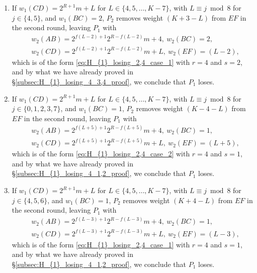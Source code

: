 \documentclass[11pt,reqno]{amsart}
\theoremstyle{definition}
\theoremstyle{definition}
\begin{document}
\begin{enumerate}
\begin{enumerate}
\item If $w_{1}(CD)=2^{R+1}m+L$ for $L \in \{4,5,\ldots,K-7\}$, with $L \equiv j \bmod 8$ for $j \in \{4,5\}$, and $w_{1}(BC)=2$, $P_{2}$ removes weight $(K+3-L)$ from $EF$ in the second round, leaving $P_{1}$ with
\begin{align}
{}&w_{2}(AB)=2^{f(L-2)+1}2^{R-f(L-2)}m+4,\ w_{2}(BC)=2,\nonumber\\
{}&w_{2}(CD)=2^{f(L-2)+1}2^{R-f(L-2)}m+L,\ w_{2}(EF)=(L-2),\nonumber
\end{align}
which is of the form \eqref{eq:H_{1}_losing_2,4_case_1} with $r=4$ and $s=2$, and by what we have already proved in \S\ref{subsec:H_{1}_losing_4_3,4_proof}, we conclude that $P_{1}$ loses. 

\item If $w_{1}(CD)=2^{R+1}m+L$ for $L \in \{4,5,\ldots,K-7\}$, with $L \equiv j \bmod 8$ for $j \in \{0,1,2,3,7\}$, and $w_{1}(BC)=1$, $P_{2}$ removes weight $(K-4-L)$ from $EF$ in the second round, leaving $P_{1}$ with
\begin{align}
{}&w_{2}(AB)=2^{f(L+5)+1}2^{R-f(L+5)}m+4,\ w_{2}(BC)=1,\nonumber\\
{}&w_{2}(CD)=2^{f(L+5)+1}2^{R-f(L+5)}m+L,\ w_{2}(EF)=(L+5),\nonumber
\end{align}
which is of the form \eqref{eq:H_{1}_losing_2,4_case_2} with $r=4$ and $s=1$, and by what we have already proved in \S\ref{subsec:H_{1}_losing_4_1,2_proof}, we conclude that $P_{1}$ loses.

\item If $w_{1}(CD)=2^{R+1}m+L$ for $L \in \{4,5,\ldots,K-7\}$, with $L \equiv j \bmod 8$ for $j \in \{4,5,6\}$, and $w_{1}(BC)=1$, $P_{2}$ removes weight $(K+4-L)$ from $EF$ in the second round, leaving $P_{1}$ with
\begin{align}
{}&w_{2}(AB)=2^{f(L-3)+1}2^{R-f(L-3)}m+4,\ w_{2}(BC)=1,\nonumber\\
{}&w_{2}(CD)=2^{f(L-3)+1}2^{R-f(L-3)}m+L,\ w_{2}(EF)=(L-3),\nonumber
\end{align}
which is of the form \eqref{eq:H_{1}_losing_2,4_case_1} with $r=4$ and $s=1$, and by what we have already proved in \S\ref{subsec:H_{1}_losing_4_1,2_proof}, we conclude that $P_{1}$ loses.


\end{enumerate}
\end{enumerate}
\end{document}
